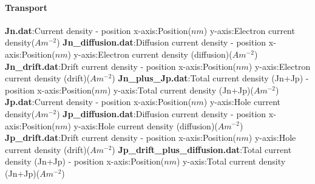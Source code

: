 \paragraph{Transport}
\textbf{Jn.dat}:Current density - position\newline
x-axis:Position($nm$)\newline
y-axis:Electron current density($A m^{-2}$)\newline
\newline
\textbf{Jn\_diffusion.dat}:Diffusion current density - position\newline
x-axis:Position($nm$)\newline
y-axis:Electron current density (diffusion)($A m^{-2}$)\newline
\newline
\textbf{Jn\_drift.dat}:Drift current density - position\newline
x-axis:Position($nm$)\newline
y-axis:Electron current density (drift)($A m^{-2}$)\newline
\newline
\textbf{Jn\_plus\_Jp.dat}:Total current density (Jn+Jp) - position\newline
x-axis:Position($nm$)\newline
y-axis:Total current density (Jn+Jp)($A m^{-2}$)\newline
\newline
\textbf{Jp.dat}:Current density - position\newline
x-axis:Position($nm$)\newline
y-axis:Hole current density($A m^{-2}$)\newline
\newline
\textbf{Jp\_diffusion.dat}:Diffusion current density - position\newline
x-axis:Position($nm$)\newline
y-axis:Hole current density (diffusion)($A m^{-2}$)\newline
\newline
\textbf{Jp\_drift.dat}:Drift current density - position\newline
x-axis:Position($nm$)\newline
y-axis:Hole current density (drift)($A m^{-2}$)\newline
\newline
\textbf{Jp\_drift\_plus\_diffusion.dat}:Total current density (Jn+Jp) - position\newline
x-axis:Position($nm$)\newline
y-axis:Total current density (Jn+Jp)($A m^{-2}$)\newline
\newline
